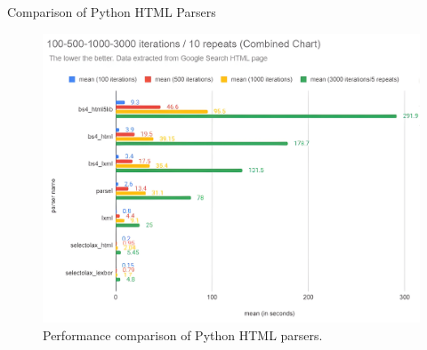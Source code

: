 \documentclass[10pt]{beamer}
\begin{document}
	
	\begin{frame}{Comparison of Python HTML Parsers}
		\begin{figure}
			\centering
			\includegraphics[width=.8\textwidth]{parser-benchmark}
			\caption{Performance comparison of Python HTML parsers.}
			\label{fig:parser-performance}
		\end{figure}
	\end{frame}
	
\end{document}
